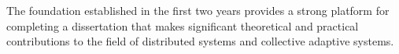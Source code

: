 \documentclass[runningheads]{llncs}
\begin{document}
The foundation established in the first two years provides a strong platform for completing a dissertation that makes significant theoretical and practical contributions to the field of distributed systems and collective adaptive systems.


%
%
%


\end{document}
